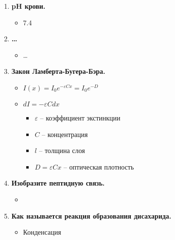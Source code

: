 \documentclass[11pt,twocolumn]{report}
\begin{document}
\begin{enumerate}
\def\labelenumi{\arabic{enumi}.}

\item \textbf{pH крови.}
\begin{itemize}
    \item 7.4
\end{itemize}
%
\pagebreak[2]       %

\item \textbf{\ldots}
\begin{itemize}
    \item \ldots
\end{itemize}
\pagebreak[2]

\item \textbf{Закон Ламберта-Бугера-Бэра.}
\begin{itemize}
    \item $I(x) = I_0 e^{-\varepsilon Cx} = I_0 e^{-D}$
    \item $dI = -\varepsilon C dx$

    \begin{itemize}
        \item $\varepsilon$ -- коэффициент экстинкции
        \item $C$ -- концентрация
        \item $l$ -- толщина слоя
        \item $D = \varepsilon Cx$ -- оптическая плотность
    \end{itemize}
\end{itemize}
\pagebreak[2]

\item \textbf{Изобразите пептидную связь.}
\begin{itemize}
    \item {}  %
\end{itemize}
\pagebreak[2]

\item \textbf{Как называется реакция образования дисахарида.}
\begin{itemize}
    \item Конденсация
\end{itemize}
\pagebreak[2]


\end{enumerate}
\end{document}
